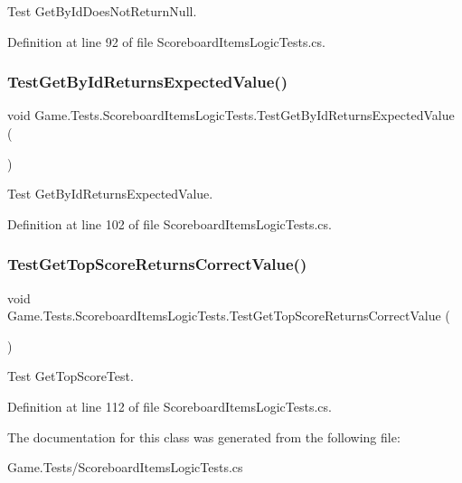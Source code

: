 Test Get\+By\+Id\+Does\+Not\+Return\+Null. 



Definition at line 92 of file Scoreboard\+Items\+Logic\+Tests.\+cs.

\mbox{\label{class_game_1_1_tests_1_1_scoreboard_items_logic_tests_ad516ef0d1b1ed53bbf86e449584ac5d3}} 
\subsubsection{\texorpdfstring{TestGetByIdReturnsExpectedValue()}{TestGetByIdReturnsExpectedValue()}}
{\footnotesize\ttfamily void Game.\+Tests.\+Scoreboard\+Items\+Logic\+Tests.\+Test\+Get\+By\+Id\+Returns\+Expected\+Value (\begin{DoxyParamCaption}{ }\end{DoxyParamCaption})}



Test Get\+By\+Id\+Returns\+Expected\+Value. 



Definition at line 102 of file Scoreboard\+Items\+Logic\+Tests.\+cs.

\mbox{\label{class_game_1_1_tests_1_1_scoreboard_items_logic_tests_a306dbcb84a094d2579c3e094a1958cbc}} 
\subsubsection{\texorpdfstring{TestGetTopScoreReturnsCorrectValue()}{TestGetTopScoreReturnsCorrectValue()}}
{\footnotesize\ttfamily void Game.\+Tests.\+Scoreboard\+Items\+Logic\+Tests.\+Test\+Get\+Top\+Score\+Returns\+Correct\+Value (\begin{DoxyParamCaption}{ }\end{DoxyParamCaption})}



Test Get\+Top\+Score\+Test. 



Definition at line 112 of file Scoreboard\+Items\+Logic\+Tests.\+cs.



The documentation for this class was generated from the following file\+:\begin{DoxyCompactItemize}
\item 
Game.\+Tests/Scoreboard\+Items\+Logic\+Tests.\+cs\end{DoxyCompactItemize}
